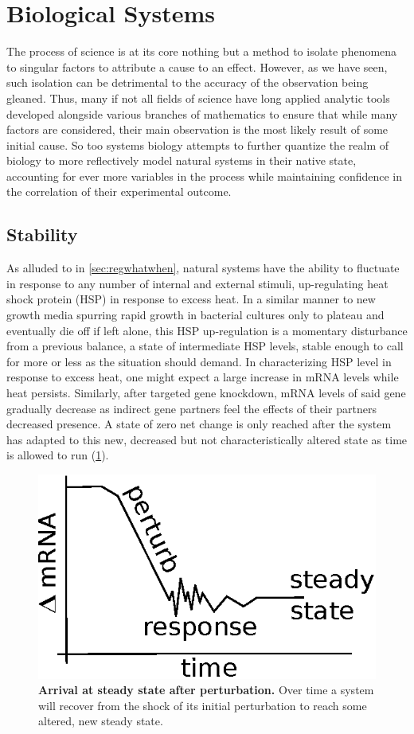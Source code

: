% 
% 
\section{Biological Systems}
\label{sec:biosys}
The process of science is at its core nothing but a method to isolate phenomena to singular factors to attribute a cause to an effect. However, as we have seen, such isolation can be detrimental to the accuracy of the observation being gleaned. Thus, many if not all fields of science have long applied analytic tools developed alongside various branches of mathematics to ensure that while many factors are considered, their main observation is the most likely result of some initial cause. So too systems biology attempts to further quantize the realm of biology to more reflectively model natural systems in their native state, accounting for ever more variables in the process while maintaining confidence in the correlation of their experimental outcome.

\subsection{Stability}
\label{sec:stab}
As alluded to in \cref{sec:regwhatwhen}, natural systems have the ability to fluctuate in response to any number of internal and external stimuli, \eg up-regulating heat shock protein (HSP) in response to excess heat. In a similar manner to new growth media spurring rapid growth in bacterial cultures only to plateau and eventually die off if left alone, this HSP up-regulation is a momentary disturbance from a previous balance, a state of intermediate HSP levels, stable enough to call for more or less as the situation should demand. In characterizing HSP level in response to excess heat, one might expect a large increase in mRNA levels while heat persists. Similarly, after targeted gene knockdown, mRNA levels of said gene gradually decrease as indirect gene partners feel the effects of their partners decreased presence. A state of zero net change is only reached after the system has adapted to this new, decreased but not characteristically altered state as time is allowed to run (\cref{fig:SS}).

\begin{figure}[H]
\centering
\includegraphics[width=.5\linewidth]{4/pert.eps}
\caption{\textbf{Arrival at steady state after perturbation.} Over time a system will recover from the shock of its initial perturbation to reach some altered, new steady state.
}
\label{fig:SS}
\end{figure}

